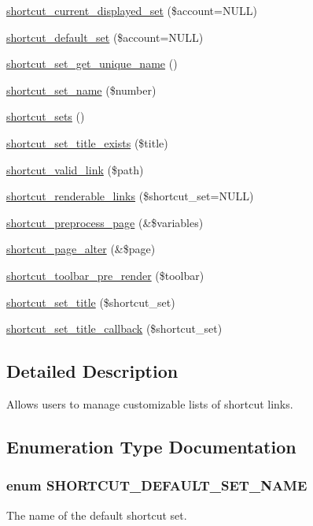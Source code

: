 \begin{DoxyCompactItemize}
\item 
\hyperlink{shortcut_8module_aac22f4373abaf143593c41eef3284d3e}{shortcut\_\-current\_\-displayed\_\-set} (\$account=NULL)
\item 
\hyperlink{shortcut_8module_aa6912cef5f9525463ac2e317211cc72d}{shortcut\_\-default\_\-set} (\$account=NULL)
\item 
\hyperlink{shortcut_8module_a1765cac37f39a6c3dd8ebb81c0084f8c}{shortcut\_\-set\_\-get\_\-unique\_\-name} ()
\item 
\hyperlink{shortcut_8module_a2d5740d822f16b0a0fdf942f5bef64f7}{shortcut\_\-set\_\-name} (\$number)
\item 
\hyperlink{shortcut_8module_a002474cc2439616432838649c8639983}{shortcut\_\-sets} ()
\item 
\hyperlink{shortcut_8module_ac8fa00be9a5996238d85e6ce8705f29b}{shortcut\_\-set\_\-title\_\-exists} (\$title)
\item 
\hyperlink{shortcut_8module_a79b9fad118659485efae61eb194a0466}{shortcut\_\-valid\_\-link} (\$path)
\item 
\hyperlink{shortcut_8module_a707fddca9514c991a2a7d05deab36072}{shortcut\_\-renderable\_\-links} (\$shortcut\_\-set=NULL)
\item 
\hyperlink{shortcut_8module_a1dbc0d2f892a049896754e0f57a3015c}{shortcut\_\-preprocess\_\-page} (\&\$variables)
\item 
\hyperlink{shortcut_8module_aed1e5026d91d1e85d44b433c09dae17e}{shortcut\_\-page\_\-alter} (\&\$page)
\item 
\hyperlink{shortcut_8module_a0fe1d9ead548329fa4bad82c69ff921e}{shortcut\_\-toolbar\_\-pre\_\-render} (\$toolbar)
\item 
\hyperlink{shortcut_8module_a935b8613a1328fdd3f713c50f368a9bf}{shortcut\_\-set\_\-title} (\$shortcut\_\-set)
\item 
\hyperlink{shortcut_8module_a114025d0a62957dd54875b0d3aa7cd6f}{shortcut\_\-set\_\-title\_\-callback} (\$shortcut\_\-set)
\end{DoxyCompactItemize}


\subsection{Detailed Description}
Allows users to manage customizable lists of shortcut links. 

\subsection{Enumeration Type Documentation}
\hypertarget{shortcut_8module_ab0a3fec294263172ae0acd5917ee2247}{
\subsubsection[{SHORTCUT\_\-DEFAULT\_\-SET\_\-NAME}]{\setlength{\rightskip}{0pt plus 5cm}enum {\bf SHORTCUT\_\-DEFAULT\_\-SET\_\-NAME}}}
\label{shortcut_8module_ab0a3fec294263172ae0acd5917ee2247}
The name of the default shortcut set.

